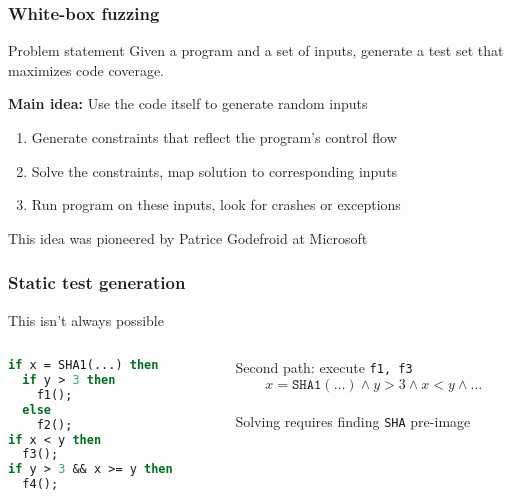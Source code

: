 \documentclass[10pt,xcolor={dvipsnames}]{beamer}
\begin{document}
\begin{frame}

\frametitle{White-box fuzzing}

\begin{exampleblock}{Problem statement}
Given a program and a set of inputs, generate a test set that maximizes code coverage.
\end{exampleblock}

\pause
\vspace*{1em}
\textbf{Main idea:} Use the code itself to generate random inputs
\begin{enumerate}
\item Generate constraints that reflect the program's control flow \\[0.5em]
\item Solve the constraints, map solution to corresponding inputs \\[0.5em]
\item Run program on these inputs, look for crashes or exceptions \\[1.5em]
\end{enumerate}

This idea was pioneered by Patrice Godefroid at Microsoft

\end{frame}


\begin{frame}[fragile]

\frametitle{Static test generation}

This isn't always possible
\\[1em]

\begin{columns}

\begin{column}{0.4\textwidth}
\begin{lstlisting}[language=Caml]
if x = SHA1(...) then
  if y > 3 then
    f1();
  else
    f2();
if x < y then
  f3();
if y > 3 && x >= y then
  f4();
\end{lstlisting}
\end{column}

\begin{column}{0.6\textwidth}

Second path: execute \texttt{f1, f3} \pause
\[
x = \mathtt{SHA1(\ldots)} \land y > 3 \land x < y \land \ldots
\]
\\[1em]

\pause
Solving requires finding \texttt{SHA} pre-image

\end{column}

\end{columns}

\end{frame}
\end{document}
